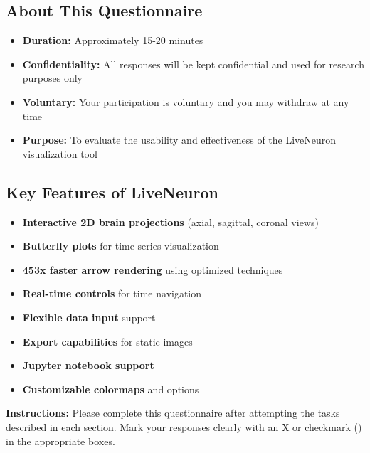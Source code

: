 \documentclass[11pt,a4paper]{article}
\begin{document}
\vspace{1cm}

\subsection*{About This Questionnaire}

\begin{itemize}[leftmargin=1.5cm]
    \item \textbf{Duration:} Approximately 15-20 minutes
    \item \textbf{Confidentiality:} All responses will be kept confidential and used for research purposes only
    \item \textbf{Voluntary:} Your participation is voluntary and you may withdraw at any time
    \item \textbf{Purpose:} To evaluate the usability and effectiveness of the LiveNeuron visualization tool
\end{itemize}

\vspace{1cm}

\subsection*{Key Features of LiveNeuron}

\begin{multicols}{2}
\begin{itemize}[leftmargin=1cm]
    \item \textbf{Interactive 2D brain projections} (axial, sagittal, coronal views)
    \item \textbf{Butterfly plots} for time series visualization
    \item \textbf{453x faster arrow rendering} using optimized techniques
    \item \textbf{Real-time controls} for time navigation
    \item \textbf{Flexible data input} support
    \item \textbf{Export capabilities} for static images
    \item \textbf{Jupyter notebook support}
    \item \textbf{Customizable colormaps} and options
\end{itemize}
\end{multicols}

\vspace{1cm}

\begin{tcolorbox}[colback=lightgray!30,colframe=darkgray,boxrule=1pt]
    \textbf{Instructions:} Please complete this questionnaire after attempting the tasks described in each section. Mark your responses clearly with an X or checkmark (\checkmark) in the appropriate boxes.
\end{tcolorbox}
\end{document}
